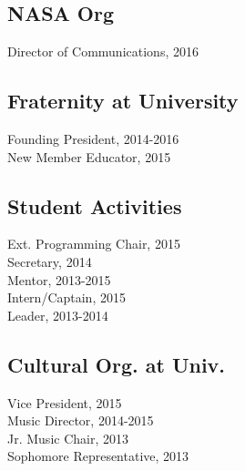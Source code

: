 \documentclass[]{deedy-resume-openfont}
\begin{document}
\begin{minipage}[t]{0.33\textwidth}
\subsection{NASA Org}
Director of Communications, 2016\\
\sectionsep

\subsection{Fraternity at University}

Founding President, 2014-2016 \\
New Member Educator, 2015 \\
\sectionsep

\subsection{Student Activities}
Ext. Programming Chair, 2015\\
Secretary, 2014 \\
Mentor, 2013-2015\\
Intern/Captain, 2015\\
Leader, 2013-2014
\sectionsep

\subsection{Cultural Org. at Univ.}
Vice President, 2015\\
Music Director, 2014-2015\\
Jr. Music Chair, 2013\\
Sophomore Representative, 2013

\sectionsep



%
%

\end{minipage} 
\hfill
\end{document}
